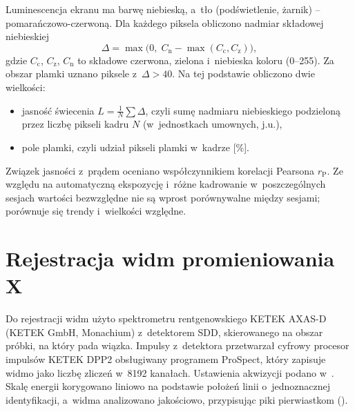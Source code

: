 Luminescencja ekranu ma barwę niebieską, a~tło (podświetlenie,
żarnik) -- pomarańczowo-czerwoną. Dla każdego piksela obliczono
nadmiar składowej niebieskiej
\begin{equation}
  \Delta = \max\bigl(0,\; C_\mathrm{n} - \max(C_\mathrm{c}, C_\mathrm{z})\bigr),
  \label{eq:nadmiar-niebieskiego}
\end{equation}
gdzie $C_\mathrm{c}$, $C_\mathrm{z}$, $C_\mathrm{n}$ to składowe
czerwona, zielona i~niebieska koloru (0--255). Za obszar plamki uznano
piksele z~$\Delta > 40$. Na tej podstawie obliczono dwie wielkości:
\begin{itemize}
  \item jasność świecenia $L = \frac{1}{N}\sum \Delta$, czyli sumę nadmiaru
        niebieskiego podzieloną przez liczbę pikseli kadru $N$ (w~jednostkach
        umownych, j.u.),
  \item pole plamki, czyli udział pikseli plamki w~kadrze [\%].
\end{itemize}

Związek jasności z~prądem oceniano współczynnikiem korelacji Pearsona
$r_\mathrm{P}$. Ze względu na automatyczną ekspozycję i~różne
kadrowanie w~poszczególnych sesjach wartości bezwzględne nie są wprost
porównywalne między sesjami; porównuje się trendy i~wielkości względne.

\section{Rejestracja widm promieniowania X}
\label{sec:rejestracja-widm}

Do rejestracji widm użyto spektrometru rentgenowskiego KETEK AXAS-D
(KETEK GmbH, Monachium) z~detektorem SDD, skierowanego na obszar próbki, na który pada
wiązka. Impulsy z~detektora przetwarzał cyfrowy procesor impulsów
KETEK DPP2 obsługiwany programem ProSpect, który zapisuje widmo jako
liczbę zliczeń w~\num{8192} kanałach. Ustawienia akwizycji podano
w~. Skalę energii korygowano liniowo na
podstawie położeń linii o~jednoznacznej identyfikacji, a~widma
analizowano jakościowo, przypisując piki pierwiastkom
().

